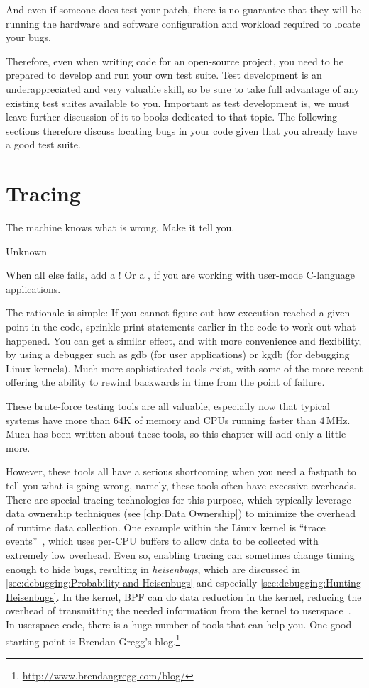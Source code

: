 And even if someone does test your patch, there is no guarantee that they
will be running the hardware and software configuration and workload
required to locate your bugs.

Therefore, even when writing code for an open-source project, you need to
be prepared to develop and run your own test suite.
Test development is an underappreciated and very valuable skill, so be
sure to take full advantage of any existing test suites available to
you.
Important as test development is, we must leave further discussion of it
to books dedicated to that topic.
The following sections therefore discuss locating bugs in your code given that
you already have a good test suite.

\section{Tracing}
\label{sec:debugging:Tracing}
%
\epigraph{The machine knows what is wrong.
	  Make it tell you.}{Unknown}

When all else fails, add a !
Or a , if you are working with user-mode C-language applications.

The rationale is simple:
If you cannot figure out how execution reached a given point in the code,
sprinkle print statements earlier in the code to work out what happened.
You can get a similar effect, and with more convenience and flexibility,
by using a debugger such as gdb (for user applications) or kgdb
(for debugging Linux kernels).
Much more sophisticated tools exist, with some of the more recent
offering the ability to rewind backwards in time from the point
of failure.

These brute-force testing tools are all valuable, especially now
that typical systems have more than 64K of memory and CPUs running
faster than 4\,MHz.
Much has been
written about these tools, so this chapter will add only a little more.

However, these tools all have a serious shortcoming when you need a
fastpath to tell you what is going wrong, namely, these tools often have
excessive overheads.
There are special tracing technologies for this purpose, which typically
leverage data ownership techniques
(see \cref{chp:Data Ownership})
to minimize the overhead of runtime data collection.
One example within the Linux kernel is
``trace events''~\cite{StevenRostedt2010perfTraceEventP1,StevenRostedt2010perfTraceEventP2,StevenRostedt2010perfTraceEventP3,StevenRostedt2010perfHP+DeathlyMacros},
which uses per-CPU buffers to allow data to be collected with
extremely low overhead.
Even so, enabling tracing can sometimes change timing enough to
hide bugs, resulting in \emph{heisenbugs}, which are discussed in
\cref{sec:debugging:Probability and Heisenbugs}
and especially \cref{sec:debugging:Hunting Heisenbugs}.
In the kernel, BPF can do data reduction in the kernel, reducing
the overhead of transmitting the needed information from the kernel
to userspace~\cite{BrendanGregg2019BPFperftools}.
In userspace code, there is a huge number of tools that can help you.
One good starting point is Brendan Gregg's blog.\footnote{
	\url{http://www.brendangregg.com/blog/}}

